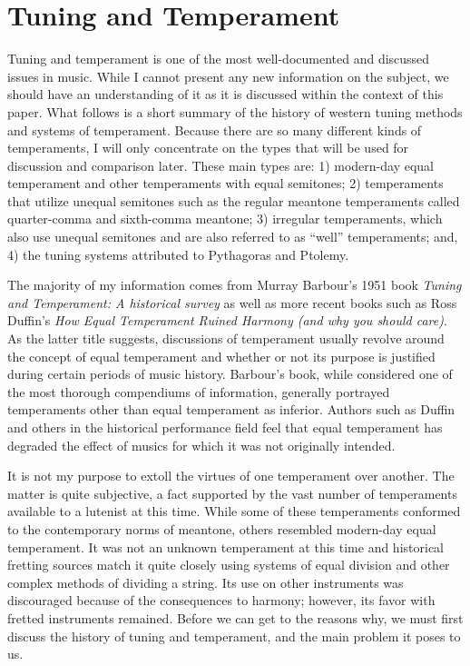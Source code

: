 \chapter{Tuning and Temperament}

Tuning and temperament is one of the most well-documented and discussed issues in music.
While I cannot present any new information on the subject, we should have an understanding
of it as it is discussed within the context of this paper. What follows is a short summary
of the history of western tuning methods and systems of temperament.  Because there are so
many different kinds of temperaments, I will only concentrate on the types that will be
used for discussion and comparison later.  These main types are: 1) modern-day equal
temperament and other temperaments with equal semitones; 2) temperaments that utilize
unequal semitones such as the regular meantone temperaments called quarter-comma and
sixth-comma meantone; 3) irregular temperaments, which also use unequal semitones and are
also referred to as ``well'' temperaments; and, 4) the tuning systems attributed to
Pythagoras and Ptolemy.

The majority of my information comes from Murray Barbour's 1951 book \textit{Tuning and
Temperament: A historical survey} as well as more recent books such as Ross Duffin's
\textit{How Equal Temperament Ruined Harmony (and why you should care)}.  As the latter
title suggests, discussions of temperament usually revolve around the concept of equal
temperament and whether or not its purpose is justified during certain periods of music
history.  Barbour's book, while considered one of the most thorough compendiums of
information, generally portrayed temperaments other than equal temperament as inferior.
Authors such as Duffin and others in the historical performance field feel that equal
temperament has degraded the effect of musics for which it was not originally intended.

It is not my purpose to extoll the virtues of one temperament over another.  The matter is
quite subjective, a fact supported by the vast number of temperaments available to a
lutenist at this time.  While some of these temperaments conformed to the contemporary
norms of meantone, others resembled modern-day equal temperament.  It was not an unknown
temperament at this time and historical fretting sources match it quite closely using
systems of equal division and other complex methods of dividing a string.  Its use on
other instruments was discouraged because of the consequences to harmony; however, its
favor with fretted instruments remained.  Before we can get to the reasons why, we must
first discuss the history of tuning and temperament, and the main problem it poses to us.

